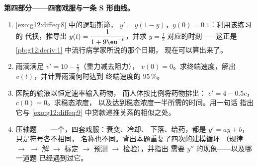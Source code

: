 \begin{problem}
\medskip
\noindent\textbf{第四部分——四套戏服与一条 S 形曲线。}
\begin{enumerate}[resume]
  \item \cref{exo:g12:diffeq:8} 中的逻辑斯谛，
        $y' = y(1 - y)$，$y(0) = 0.1$：利用该练习的
        代换，推导出
        $y(t) = \dfrac{1}{1 + 9\eu^{-t}}$，并求
         $y = \frac12$ 对应的时刻——这正是
        \cref{pb:g12:deriv:1} 中流行病学家所说的那个日期，
        现在可以算出来了。
  \item 雨滴满足 $v' = 10 - \frac v2$（重力减去阻力），
        $v(0) = 0$。求终端速度，解出
        $v(t)$，并计算雨滴何时达到
        终端速度的 $95\,\%$。
  \item 医院的输液以恒定速率输入药物，
        而人体按比例将药物排出：
        $c' = 4 - 0.5c$，$c(0) = 0$。求稳态浓度，
        以及达到稳态浓度一半所需的时间。用一句话
        指出它与
        \cref{exo:g12:diffeq:9} 中贷款递推关系的相似之处。
  \item 压轴题——一个，四套戏服：衰变、冷却、
        下落、给药，都是 $y' = ay + b$，只是符号各不相同，
        名称也不同。背出本题重复了四次的建模循环
        （规律 $\to$  $\to$ 解 $\to$
        标定 $\to$ 预测 $\to$ 检验），并指出
        需要 $y''$ 的现象——以及哪一道题
        已经遇到过它。
\end{enumerate}
\end{problem}
